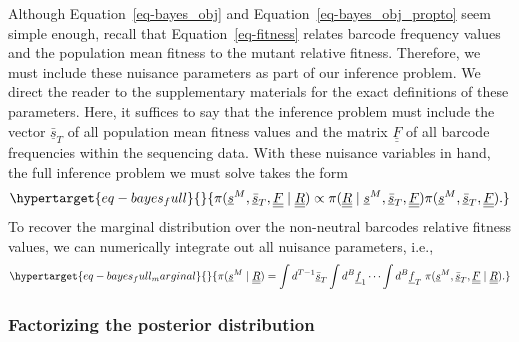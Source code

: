 \documentclass[
  letterpaper,
  DIV=11,
  numbers=noendperiod]{scrartcl}
\begin{document}
\begin{refsegment}
Although Equation~\ref{eq-bayes_obj} and
Equation~\ref{eq-bayes_obj_propto} seem simple enough, recall that
Equation~\ref{eq-fitness} relates barcode frequency values and the
population mean fitness to the mutant relative fitness. Therefore, we
must include these nuisance parameters as part of our inference problem.
We direct the reader to the supplementary materials for the exact
definitions of these parameters. Here, it suffices to say that the
inference problem must include the vector \(\underline{\bar{s}}_T\) of
all population mean fitness values and the matrix
\(\underline{\underline{F}}\) of all barcode frequencies within the
sequencing data. With these nuisance variables in hand, the full
inference problem we must solve takes the form
\begin{equation}\protect\hypertarget{eq-bayes_full}{}{
\pi(
    \underline{s}^M, \underline{\bar{s}}_T, \underline{\underline{F}} \mid
    \underline{\underline{R}}
) \propto
\pi(
    \underline{\underline{R}} \mid
    \underline{s}^M, \underline{\bar{s}}_T, \underline{\underline{F}}
)
\pi(
    \underline{s}^M, \underline{\bar{s}}_T, \underline{\underline{F}}
).
}\label{eq-bayes_full}\end{equation} To recover the marginal
distribution over the non-neutral barcodes relative fitness values, we
can numerically integrate out all nuisance parameters, i.e.,
\begin{equation}\protect\hypertarget{eq-bayes_full_marginal}{}{
\pi(\underline{s}^M \mid \underline{\underline{R}}) =
\int d^{T-1}\underline{\bar{s}}_T
\int d^{B}\underline{f}_1 \cdots
\int d^{B}\underline{f}_T
\;
\pi(
    \underline{s}^M, \underline{\bar{s}}_T, \underline{\underline{F}} \mid
    \underline{\underline{R}}
).
}\label{eq-bayes_full_marginal}\end{equation}

\hypertarget{seq-split_posterior}{%
\subsubsection{Factorizing the posterior
distribution}\label{seq-split_posterior}}


\end{refsegment}
\end{document}
